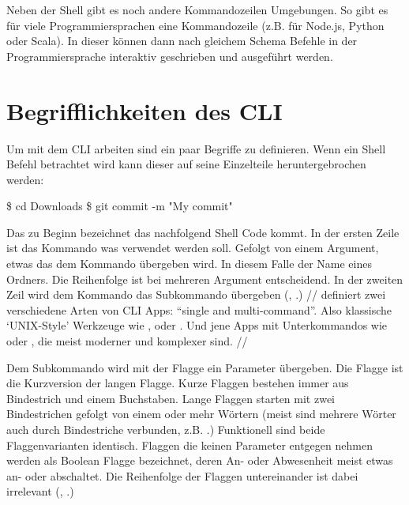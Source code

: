 \documentclass[oneside,bibliography=totocnumbered,BCOR=5mm]{scrbook}
\newenvironment{code}{\captionsetup{type=listing, skip=0pt}}{}
\begin{document}
Neben der Shell gibt es noch andere Kommandozeilen Umgebungen. So gibt es
für viele Programmiersprachen eine Kommandozeile (z.B. für Node.js, Python
oder Scala). In dieser können dann nach gleichem Schema Befehle in der
Programmiersprache interaktiv geschrieben und ausgeführt werden.

\section{Begrifflichkeiten des CLI}

Um mit dem CLI arbeiten sind ein paar Begriffe zu definieren. Wenn ein Shell
Befehl betrachtet wird kann dieser auf seine Einzelteile heruntergebrochen
werden:

\begin{code}
  \begin{shellcode}
\$ cd Downloads
\$ git commit -m "My commit"
  \end{shellcode}
\end{code}

Das \codeinline{\$} zu Beginn bezeichnet das nachfolgend Shell Code kommt.
In der ersten Zeile ist  das Kommando was verwendet werden
soll. Gefolgt von einem Argument, etwas das dem Kommando übergeben wird. In
diesem Falle der Name eines Ordners. Die Reihenfolge ist bei mehreren Argument
entscheidend. In der zweiten Zeil wird dem  Kommando das
Subkommando  übergeben (\cite{nagarajan2018}, \cite{clig}.)
//
\cite{12factor} definiert zwei verschiedene Arten von CLI Apps: ``single and
multi-command''. Also klassische `UNIX-Style' Werkzeuge wie ,
 oder . Und jene Apps mit Unterkommandos wie
 oder , die meist moderner und komplexer sind.
//

Dem  Subkommando wird mit der  Flagge ein
Parameter übergeben. Die  Flagge ist die Kurzversion der langen
 Flagge. Kurze Flaggen bestehen immer aus Bindestrich und
einem Buchstaben. Lange Flaggen starten mit zwei Bindestrichen gefolgt von einem
oder mehr Wörtern (meist sind mehrere Wörter auch durch Bindestriche verbunden,
z.B. .) Funktionell sind beide Flaggenvarianten
identisch. Flaggen die keinen Parameter entgegen nehmen werden als Boolean
Flagge bezeichnet, deren An- oder Abwesenheit meist etwas an- oder abschaltet.
Die Reihenfolge der Flaggen untereinander ist dabei irrelevant (\cite{nagarajan2018}, \cite{clig}.)
\end{document}
